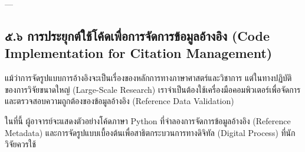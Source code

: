 \documentclass[11pt,a4paper,openany]{report}
\begin{document}
---

\subsection{๕.๖ การประยุกต์ใช้โค้ดเพื่อการจัดการข้อมูลอ้างอิง (Code Implementation for Citation Management)}


แม้ว่าการจัดรูปแบบการอ้างอิงจะเป็นเรื่องของหลักการทางภาษาศาสตร์และวิชาการ แต่ในทางปฏิบัติของการวิจัยขนาดใหญ่ (Large-Scale Research) เราจำเป็นต้องใช้เครื่องมือคอมพิวเตอร์เพื่อจัดการและตรวจสอบความถูกต้องของข้อมูลอ้างอิง (Reference Data Validation)

ในที่นี้ ผู้อาจารย์จะแสดงตัวอย่างโค้ดภาษา Python ที่จำลองการจัดการข้อมูลอ้างอิง (Reference Metadata) และการจัดรูปแบบเบื้องต้นเพื่อสาธิตกระบวนการทางดิจิทัล (Digital Process) ที่นักวิจัยควรใช้
\end{document}
